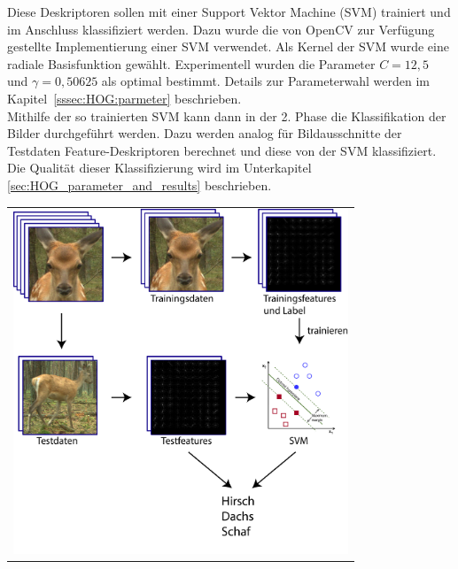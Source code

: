 Diese Deskriptoren sollen mit einer Support Vektor Machine (SVM) trainiert und im Anschluss klassifiziert werden. Dazu wurde die von OpenCV zur Verfügung gestellte Implementierung einer SVM verwendet. Als Kernel der SVM wurde eine radiale Basisfunktion gewählt. Experimentell wurden die Parameter $C = 12,5$ und $\gamma = 0,50625$ als optimal bestimmt. Details zur Parameterwahl werden im Kapitel~\ref{sssec:HOG:parmeter} beschrieben.\\
Mithilfe der so trainierten SVM kann dann in der 2. Phase die Klassifikation der Bilder durchgeführt werden. Dazu werden analog für Bildausschnitte der Testdaten Feature-Deskriptoren berechnet und diese von der SVM klassifiziert. Die Qualität dieser Klassifizierung wird im Unterkapitel \ref{sec:HOG_parameter_and_results} beschrieben.
\begin{center}
\begin{tabular}{c}
\includegraphics[trim={0 0cm 0cm 0cm},clip=true,width=10cm]{img/ClassificationOverview.png}
\end{tabular}
\label{fig:hog_classification_ov}
\end{center}
